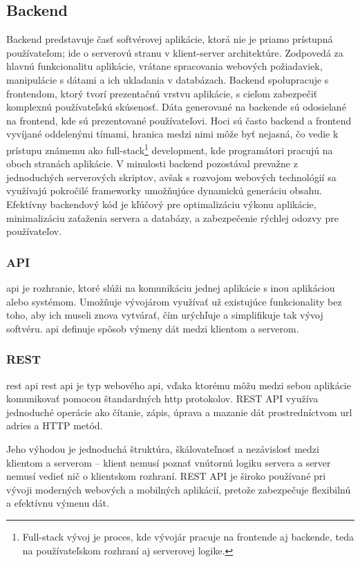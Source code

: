 \subsection{Backend}
Backend predstavuje časť softvérovej aplikácie, ktorá nie je priamo prístupná používateľom; ide o serverovú stranu v klient-server architektúre.
 Zodpovedá za hlavnú funkcionalitu aplikácie, vrátane spracovania webových požiadaviek, manipulácie s dátami a ich ukladania v databázach. Backend spolupracuje s frontendom, ktorý tvorí prezentačnú vrstvu aplikácie, s cieľom zabezpečiť komplexnú používateľskú skúsenosť. 
 Dáta generované na backende sú odosielané na frontend, kde sú prezentované používateľovi.
  Hoci sú často backend a frontend vyvíjané oddelenými tímami, hranica medzi nimi môže byť nejasná, čo vedie k prístupu známemu ako full-stack\footnote{Full-stack vývoj je proces, kde vývojár pracuje na frontende aj backende, teda na používateľskom rozhraní aj serverovej logike.} development, kde programátori pracujú na oboch stranách aplikácie.
   V minulosti backend pozostával prevažne z jednoduchých serverových skriptov, avšak s rozvojom webových technológií sa využívajú pokročilé frameworky umožňujúce dynamickú generáciu obsahu.
 Efektívny backendový kód je kľúčový pre optimalizáciu výkonu aplikácie, minimalizáciu zaťaženia servera a databázy, a zabezpečenie rýchlej odozvy pre používateľov. \cite{backend} 
 \subsubsection*{API}
 \acrfull{api} je rozhranie, ktoré slúži na komunikáciu jednej aplikácie s inou aplikáciou alebo systémom.
 Umožňuje vývojárom využívať už existujúce funkcionality bez toho, aby ich museli znova vytvárať, čím urýchľuje a simplifikuje tak vývoj softvéru.
  \acrshort{api} definuje spôsob výmeny dát medzi klientom a serverom. \cite{api}
 \subsubsection*{REST}
 \acrshort{rest} \acrshort{api} \acrfull{rest} \acrfull{api} je typ webového \acrshort{api}, vďaka ktorému môžu medzi sebou aplikácie komunikovať pomocou štandardných \acrshort{http} protokolov. 
 REST API využíva jednoduché operácie ako čítanie, zápis, úprava a mazanie dát prostredníctvom \acrshort{url} adries a HTTP metód.

Jeho výhodou je jednoduchá štruktúra, škálovateľnosť a nezávislosť medzi klientom a serverom – klient nemusí poznať vnútornú logiku servera a server nemusí vedieť nič o klientskom rozhraní.
 REST API je široko používané pri vývoji moderných webových a mobilných aplikácií, pretože zabezpečuje flexibilnú a efektívnu výmenu dát.\cite{rest}
